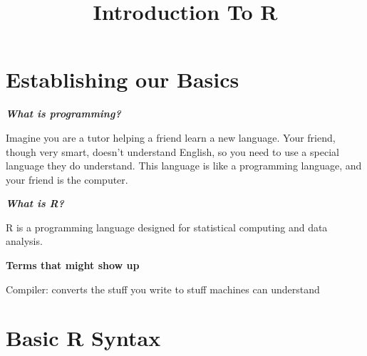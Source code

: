\documentclass[
]{article}
\title{Introduction To R}
\author{}
\date{\vspace{-2.5em}}
\begin{document}
\maketitle

\hypertarget{establishing-our-basics}{%
\section{\texorpdfstring{\textbf{Establishing our
Basics}}{Establishing our Basics}}\label{establishing-our-basics}}

\textbf{\emph{What is programming?}}

Imagine you are a tutor helping a friend learn a new language. Your
friend, though very smart, doesn't understand English, so you need to
use a special language they do understand. This language is like a
programming language, and your friend is the computer.

\textbf{\emph{What is R?}}

R is a programming language designed for statistical computing and data
analysis.

\textbf{Terms that might show up}

Compiler: converts the stuff you write to stuff machines can understand

\hypertarget{basic-r-syntax}{%
\section{\texorpdfstring{\textbf{Basic R
Syntax}}{Basic R Syntax}}\label{basic-r-syntax}}
\end{document}
